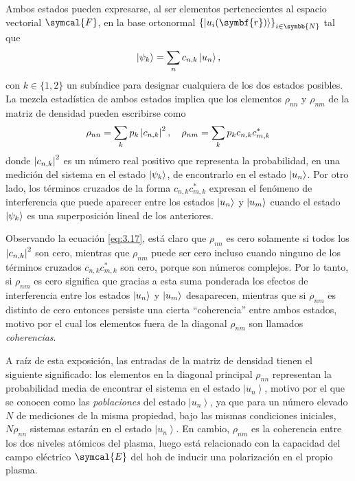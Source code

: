 Ambos estados pueden expresarse, al ser elementos pertenecientes al espacio vectorial $\symcal{F}$, en la base ortonormal $\left\{\ket{u_{i}(\symbf{r})}\right\}_{i \in \symbb{N}}$ tal que
\begin{equation}\label{eq:3.16}
  \left|\psi_{k}\right\rangle = \sum_{n} c_{n,k} \left|u_{n}\right\rangle,
\end{equation}
con $k \in \{1,2\}$ un subíndice para designar cualquiera de los dos estados posibles. La mezcla estadística de ambos estados implica que los elementos $\rho_{nn}$ y $\rho_{nm}$ de la matriz de densidad pueden escribirse como
\begin{equation}\label{eq:3.17}
  \rho_{nn} = \sum_{k} p_{k} \left|c_{n,k}\right|^{2}, \quad 
  \rho_{nm} = \sum_{k} p_{k} c_{n,k}c^{*}_{m,k}
\end{equation}
donde $\left|c_{n,k}\right|^{2}$ es un número real positivo que representa la probabilidad, en una medición del sistema en el estado $\left|\psi_{k}\right\rangle$, de encontrarlo en el estado $\left|u_{n}\right\rangle$. Por otro lado, los términos cruzados de la forma $c_{n,k}c^{*}_{m,k}$ expresan el fenómeno de interferencia que puede aparecer entre los estados $\left|u_{n}\right\rangle$ y $\left|u_{m}\right\rangle$ cuando el estado $\left|\psi_{k}\right\rangle$ es una superposición lineal de los anteriores. 

Observando la ecuación \eqref{eq:3.17}, está claro que $\rho_{nn}$ es cero solamente si todos los $\left|c_{n,k}\right|^{2}$ son cero, mientras que $\rho_{nm}$ puede ser cero incluso cuando ninguno de los términos cruzados $c_{n,k}c^{*}_{m,k}$ son cero, porque son números complejos. Por lo tanto, si $\rho_{nm}$ es cero significa que gracias a esta suma ponderada los efectos de interferencia entre los estados $\left|u_{n}\right\rangle$ y $\left|u_{m}\right\rangle$ desaparecen, mientras que si $\rho_{nm}$ es distinto de cero entonces persiste una cierta \enquote{coherencia} entre ambos estados, motivo por el cual los elementos fuera de la diagonal $\rho_{nm}$ son llamados \emph{coherencias}.

A raíz de esta exposición, las entradas de la matriz de densidad tienen el siguiente significado: los elementos en la diagonal principal $\rho_{nn}$ representan la probabilidad media de encontrar el sistema en el estado $\left|u_{n}\right\rangle$, motivo por el que se conocen como las \emph{poblaciones} del estado $\left|u_{n}\right\rangle$, ya que para un número elevado $N$ de mediciones de la misma propiedad, bajo las mismas condiciones iniciales, $N \rho_{nn}$ sistemas estarán en el estado $\left|u_{n}\right\rangle$. En cambio, $\rho_{nm}$ es la coherencia entre los dos niveles atómicos del plasma, luego está relacionado con la capacidad del campo eléctrico $\symcal{E}$ del \acrshort{hoh} de inducir una polarización en el propio plasma.


